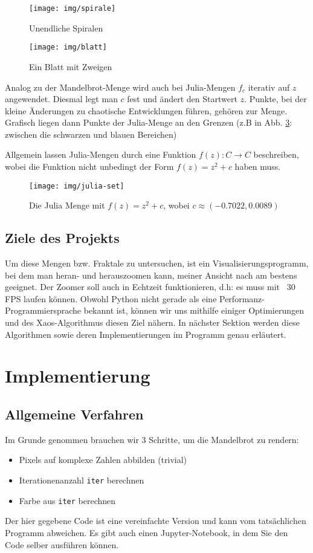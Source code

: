 \documentclass{article}
\begin{document}
\begin{figure}
\centering
\texttt{[image: img/spirale]}
\caption{Unendliche Spiralen}
\label{fig:spiralen}
\end{figure}

\begin{figure}
\centering
\texttt{[image: img/blatt]}
\caption{Ein Blatt mit Zweigen}
\label{fig:blatt}
\end{figure}

Analog zu der Mandelbrot-Menge wird auch bei Julia-Mengen $f_c$ iterativ auf $z$ angewendet. Diesmal legt man $c$ fest und ändert den Startwert $z$. Punkte, bei der kleine Änderungen zu chaotische Entwicklungen führen, gehören zur Menge. Grafisch liegen dann Punkte der Julia-Menge an den Grenzen (z.B in Abb. \ref{fig:julia-set}: zwischen die schwarzen und blauen Bereichen) 

Allgemein lassen Julia-Mengen durch eine Funktion $f(z): C \rightarrow C$ beschreiben, wobei die Funktion nicht unbedingt der Form $f(z) = z^2 +c$ haben muss.

\begin{figure}[!htb]
\centering
\texttt{[image: img/julia-set]}
\caption{Die Julia Menge mit $f(z) = z^2 +c$, wobei $c \approx (-0.7022, 0.0089)$}
\label{fig:julia-set}
\end{figure}


\subsection{Ziele des Projekts}	
Um diese Mengen bzw. Fraktale zu untersuchen, ist ein Visualisierungsprogramm, bei dem man heran- und herauszoomen kann, meiner Ansicht nach am bestens geeignet. Der Zoomer soll auch in Echtzeit funktionieren, d.h: es muss mit ~30 FPS laufen können. Obwohl Python nicht gerade als eine Performanz-Programmiersprache bekannt ist, können wir uns mithilfe einiger Optimierungen und des Xaos-Algorithmus diesen Ziel nähern. In nächster Sektion werden diese Algorithmen sowie deren Implementierungen im Programm genau erläutert.

\section{Implementierung}
\subsection{Allgemeine Verfahren}
Im Grunde genommen brauchen wir 3 Schritte, um die Mandelbrot zu rendern:
\begin{itemize}
\item Pixels auf komplexe Zahlen abbilden (trivial)
\item Iterationenanzahl \lstinline|iter| berechnen
\item Farbe aus \lstinline|iter| berechnen
\end{itemize}
Der hier gegebene Code ist eine vereinfachte Version und kann vom tatsächlichen Programm abweichen. Es gibt auch einen Jupyter-Notebook, in dem Sie den Code selber ausführen können.
\end{document}
